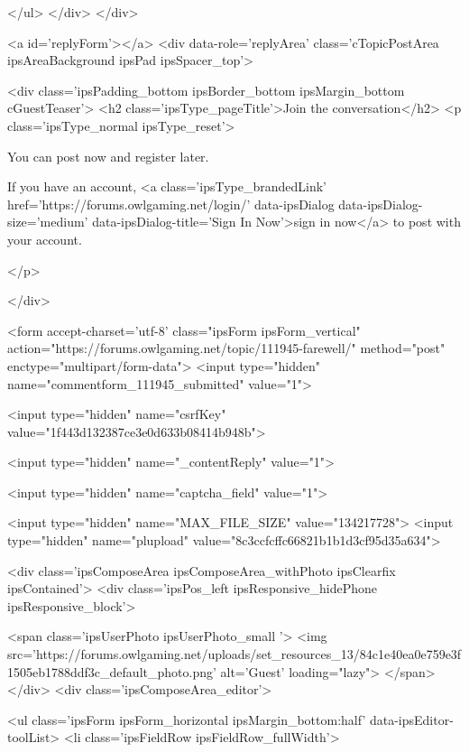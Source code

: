		
	</ul>
</div>
		</div>
	

	
		<a id='replyForm'></a>
		<div data-role='replyArea' class='cTopicPostArea ipsAreaBackground ipsPad  ipsSpacer_top'>
			
				
				

	
		<div class='ipsPadding_bottom ipsBorder_bottom ipsMargin_bottom cGuestTeaser'>
			<h2 class='ipsType_pageTitle'>Join the conversation</h2>
			<p class='ipsType_normal ipsType_reset'>
	
				
					You can post now and register later.
				
				If you have an account, <a class='ipsType_brandedLink' href='https://forums.owlgaming.net/login/' data-ipsDialog data-ipsDialog-size='medium' data-ipsDialog-title='Sign In Now'>sign in now</a> to post with your account.
				
			</p>
	
		</div>
	


<form accept-charset='utf-8' class="ipsForm ipsForm_vertical" action="https://forums.owlgaming.net/topic/111945-farewell/" method="post" enctype="multipart/form-data">
	<input type="hidden" name="commentform_111945_submitted" value="1">
	
		<input type="hidden" name="csrfKey" value="1f443d132387ce3e0d633b08414b948b">
	
		<input type="hidden" name="_contentReply" value="1">
	
		<input type="hidden" name="captcha_field" value="1">
	
	
		<input type="hidden" name="MAX_FILE_SIZE" value="134217728">
		<input type="hidden" name="plupload" value="8c3ccfcffc66821b1b1d3cf95d35a634">
	
	<div class='ipsComposeArea ipsComposeArea_withPhoto ipsClearfix ipsContained'>
		<div class='ipsPos_left ipsResponsive_hidePhone ipsResponsive_block'>

	<span class='ipsUserPhoto ipsUserPhoto_small '>
		<img src='https://forums.owlgaming.net/uploads/set_resources_13/84c1e40ea0e759e3f1505eb1788ddf3c_default_photo.png' alt='Guest' loading="lazy">
	</span>
</div>
		<div class='ipsComposeArea_editor'>
			
				
					
				
					
						<ul class='ipsForm ipsForm_horizontal ipsMargin_bottom:half' data-ipsEditor-toolList>
							<li class='ipsFieldRow ipsFieldRow_fullWidth'>
								



